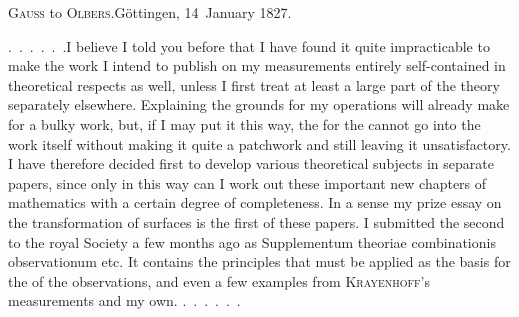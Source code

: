 \begin{center}
\textsc{Gauss} to \textsc{Olbers}.\quad Göttingen, 14~January 1827.
\end{center}

\par\noindent\hspace*{\parindent}\mbox{.\ .\ .\ .\ .\ .}\quad I believe I told you before that I have found it quite impracticable to make the work I intend to publish on my measurements entirely self-contained in theoretical respects as well, unless I first treat at least a large part of the theory separately elsewhere.
Explaining the grounds for my operations will already make for a bulky work, but, if I may put it this way, the  for the  cannot go into the work itself without making it quite a patchwork and still leaving it unsatisfactory.
I have therefore decided first to develop various theoretical subjects in separate papers, since only in this way can I work out these important new chapters of mathematics with a certain degree of completeness.
In a sense my prize essay on the transformation of surfaces is the first of these papers. I submitted the second to the royal Society a few months ago as Supplementum theoriae combinationis observationum etc.
It contains the principles that must be applied as the basis for the  of the observations, and even a few examples from \textsc{Krayenhoff}'s measurements and my own.\newline
\mbox{.\ .\ .\ .\ .\ .}\par

